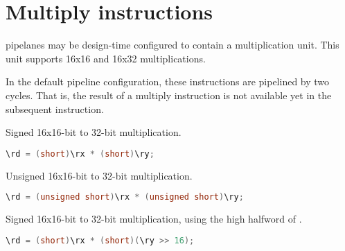 
\section{Multiply instructions}

\rvex{} pipelanes may be design-time configured to contain a multiplication
unit. This unit supports 16x16 and 16x32 multiplications.

In the default pipeline configuration, these instructions are pipelined by
two cycles. That is, the result of a multiply instruction is not available yet
in the subsequent instruction.

Signed 16x16-bit to 32-bit multiplication.

\begin{lstlisting}[numbers=none, basicstyle=\ttfamily\footnotesize, language=C++]
\rd = (short)\rx * (short)\ry;
\end{lstlisting}

Unsigned 16x16-bit to 32-bit multiplication.

\begin{lstlisting}[numbers=none, basicstyle=\ttfamily\footnotesize, language=C++]
\rd = (unsigned short)\rx * (unsigned short)\ry;
\end{lstlisting}

Signed 16x16-bit to 32-bit multiplication, using the high halfword of
\code{\ry}.

\begin{lstlisting}[numbers=none, basicstyle=\ttfamily\footnotesize, language=C++]
\rd = (short)\rx * (short)(\ry >> 16);
\end{lstlisting}

